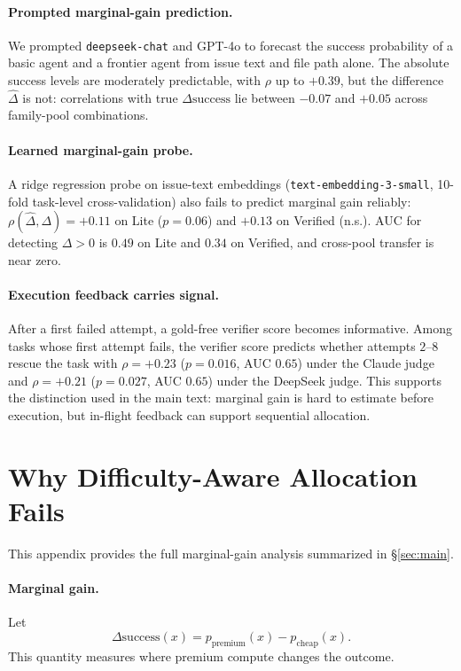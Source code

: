\documentclass{article}
\begin{document}
\paragraph{Prompted marginal-gain prediction.}
We prompted \texttt{deepseek-chat} and GPT-4o to forecast the success
probability of a basic agent and a frontier agent from issue text and
file path alone. The absolute success levels are moderately
predictable, with $\rho$ up to $+0.39$, but the difference
$\hat{\Delta}$ is not: correlations with true
$\Delta\mathrm{success}$ lie between $-0.07$ and $+0.05$ across
family-pool combinations.

\paragraph{Learned marginal-gain probe.}
A ridge regression probe on issue-text embeddings
(\texttt{text-embedding-3-small}, 10-fold task-level cross-validation)
also fails to predict marginal gain reliably:
$\rho(\hat{\Delta},\Delta)=+0.11$ on Lite ($p=0.06$) and
$+0.13$ on Verified (n.s.). AUC for detecting $\Delta>0$ is $0.49$
on Lite and $0.34$ on Verified, and cross-pool transfer is near zero.

\paragraph{Execution feedback carries signal.}
After a first failed attempt, a gold-free verifier score becomes
informative. Among tasks whose first attempt fails, the verifier score
predicts whether attempts $2$--$8$ rescue the task with
$\rho=+0.23$ ($p=0.016$, AUC $0.65$) under the Claude judge and
$\rho=+0.21$ ($p=0.027$, AUC $0.65$) under the DeepSeek judge. This
supports the distinction used in the main text: marginal gain is hard
to estimate before execution, but in-flight feedback can support
sequential allocation.

\section{Why Difficulty-Aware Allocation Fails}
\label{app:whyfail}

This appendix provides the full marginal-gain analysis summarized in
\S\ref{sec:main}.

\paragraph{Marginal gain.}
Let
\[
\Delta\mathrm{success}(x)
=
p_{\mathrm{premium}}(x)-p_{\mathrm{cheap}}(x).
\]
This quantity measures where premium compute changes the outcome.
\end{document}
